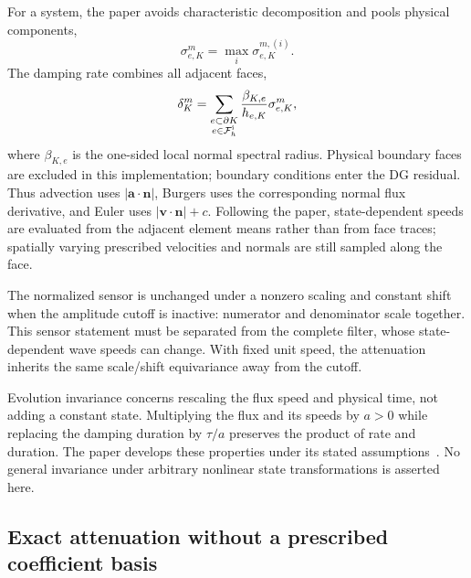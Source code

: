 For a system, the paper avoids characteristic decomposition and pools physical
components,
\begin{equation}
  \sigma^m_{e,K}=\max_i \sigma^{m,(i)}_{e,K}.
  \label{eq:oedg-pooling}
\end{equation}
The damping rate combines all adjacent faces,
\begin{equation}
  \delta_K^m = \sum_{\substack{e\subset\partial K\\e\in\mathcal F_h^{\rm i}}}
       \frac{\beta_{K,e}}{h_{e,K}}\sigma^m_{e,K},
  \label{eq:oedg-rate}
\end{equation}
where $\beta_{K,e}$ is the one-sided local normal spectral radius. Physical boundary faces are excluded in this implementation; boundary conditions enter the DG residual.  Thus advection uses
$|\boldsymbol a\cdot\boldsymbol n|$, Burgers uses the corresponding normal
flux derivative, and Euler uses
$|\boldsymbol v\cdot\boldsymbol n|+c$.  Following the paper, state-dependent speeds
are evaluated from the adjacent element means rather than from face traces;
spatially varying prescribed velocities and normals are still sampled along
the face.

The normalized sensor is unchanged under a nonzero scaling and constant
shift when the amplitude cutoff is inactive: numerator and denominator scale
together. This sensor statement must be separated from the complete filter,
whose state-dependent wave speeds can change. With fixed unit speed, the attenuation inherits the same
scale/shift equivariance away from the cutoff.

Evolution invariance concerns rescaling the flux speed and physical time,
not adding a constant state. Multiplying the flux and its speeds by $a>0$
while replacing the damping duration by $\tau/a$ preserves the product of
rate and duration. The paper develops these properties under its stated
assumptions~\cite{PengEtAl2024}. No general invariance under arbitrary nonlinear state transformations
is asserted here.

\subsection{Exact attenuation without a prescribed coefficient basis}

